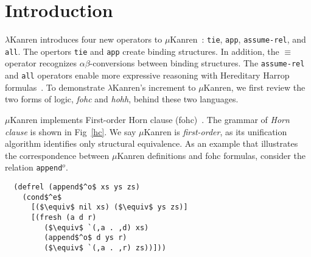 \documentclass[acmlarge,review]{acmart}
\theoremstyle{definition}
\begin{document}



\maketitle

\section{Introduction}

$\lambda$Kanren introduces four new operators to
$\mu$Kanren~\citep{hemann_kanren:_2013}: \texttt{tie}, \texttt{app},
\texttt{assume-rel}, and \texttt{all}. The opertors
\texttt{tie} and \texttt{app} create
binding structures. In addition, the $\equiv$ operator recognizes
$\alpha\beta$-conversions between binding structures. The \texttt{assume-rel}
and \texttt{all} operators
enable more expressive reasoning with Hereditary Harrop
formulas~\citep{miller_hereditary_1987}.
To demonstrate $\lambda$Kanren's increment to $\mu$Kanren, we first
review the two forms of logic, \emph{fohc} and \emph{hohh}, behind these
two languages.

$\mu$Kanren implements First-order
Horn clause (fohc)~\citep{apt_contributions_1982}. The grammar of \emph{Horn clause}
is shown in Fig~\ref{hc}. We say $\mu$Kanren is \emph{first-order}, as its
unification algorithm identifies only
structural equivalence. As an example that illustrates the correspondence
between $\mu$Kanren definitions and fohc formulas,
consider the relation \texttt{append$^o$}.

\begin{lstlisting}
  (defrel (append$^o$ xs ys zs)
    (cond$^e$
      [($\equiv$ nil xs) ($\equiv$ ys zs)]
      [(fresh (a d r)
         ($\equiv$ `(,a . ,d) xs)
         (append$^o$ d ys r)
         ($\equiv$ `(,a . ,r) zs))]))
\end{lstlisting}
\end{document}
